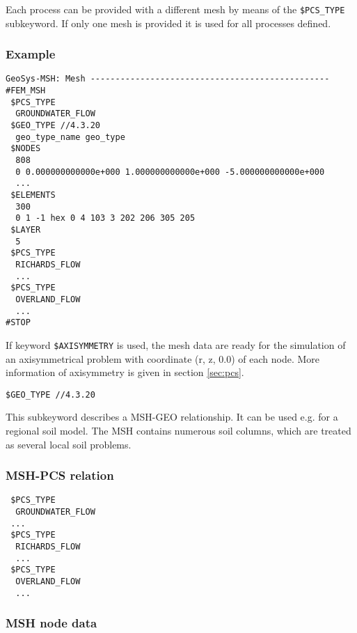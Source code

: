 Each process can be provided with a different mesh by means of the
\texttt{\$PCS\_TYPE} subkeyword. If only one mesh is provided it
is used for all processes defined.

\subsubsection{Example}

\small
\begin{verbatim}
GeoSys-MSH: Mesh ------------------------------------------------
#FEM_MSH
 $PCS_TYPE
  GROUNDWATER_FLOW
 $GEO_TYPE //4.3.20
  geo_type_name geo_type
 $NODES
  808
  0 0.000000000000e+000 1.000000000000e+000 -5.000000000000e+000
  ...
 $ELEMENTS
  300
  0 1 -1 hex 0 4 103 3 202 206 305 205
 $LAYER
  5
 $PCS_TYPE
  RICHARDS_FLOW
  ...
 $PCS_TYPE
  OVERLAND_FLOW
  ...
#STOP
\end{verbatim}
\normalsize

If keyword \texttt{\$AXISYMMETRY} is used, the mesh data are
ready for the simulation of an axisymmetrical problem with
coordinate (r, z, 0.0) of each node. More information of axisymmetry
is given in section \ref{sec:pcs}.

\small
\begin{verbatim}
$GEO_TYPE //4.3.20
\end{verbatim}
\normalsize \vspace{-2mm}
%
This subkeyword describes a MSH-GEO relationship. It can be used
e.g. for a regional soil model. The MSH contains numerous soil
columns, which are treated as several local soil problems.


\subsubsection{MSH-PCS relation}

\small
\begin{verbatim}
 $PCS_TYPE
  GROUNDWATER_FLOW
 ...
 $PCS_TYPE
  RICHARDS_FLOW
  ...
 $PCS_TYPE
  OVERLAND_FLOW
  ...
\end{verbatim}
\normalsize

\subsubsection{MSH node data}

